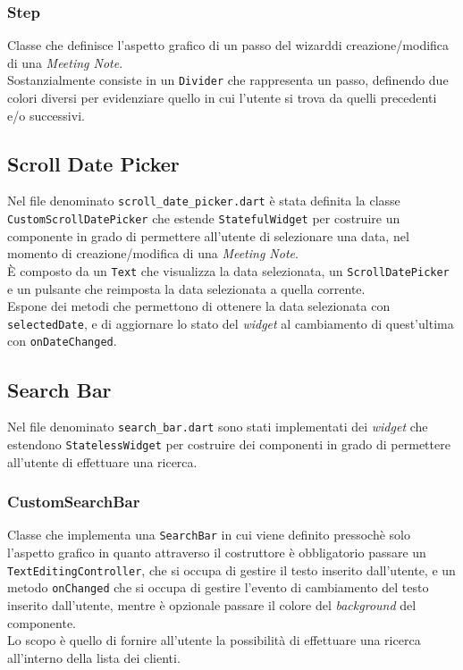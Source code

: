 \subsubsection*{Step}
\label{subsubsec:step}

Classe che definisce l'aspetto grafico di un passo del \gls{wizard}\glsoccur di creazione/modifica di una \emph{Meeting Note}.\\
Sostanzialmente consiste in un \lstinline{Divider}\cite{site:divider} che rappresenta un passo, definendo due colori diversi per evidenziare quello in cui l'utente si trova da quelli precedenti e/o successivi.

\subsection{Scroll Date Picker}
\label{subsec:scroll-date-picker}

Nel file denominato \lstinline{scroll_date_picker.dart} è stata definita la classe \lstinline{CustomScrollDatePicker} che estende \lstinline{StatefulWidget} per costruire un componente in grado di permettere all'utente di selezionare una data, nel momento di creazione/modifica di una \emph{Meeting Note}.\\
È composto da un \lstinline{Text}\cite{site:text} che visualizza la data selezionata, un \lstinline{ScrollDatePicker}\cite{site:scroll-date-picker} e un pulsante che reimposta la data selezionata a quella corrente.\\
Espone dei metodi che permettono di ottenere la data selezionata con \lstinline{selectedDate}, e di aggiornare lo stato del \emph{widget} al cambiamento di quest'ultima con \lstinline{onDateChanged}.

\subsection{Search Bar}
\label{subsec:search-bar}

Nel file denominato \lstinline{search_bar.dart} sono stati implementati dei \emph{widget} che estendono \lstinline{StatelessWidget} per costruire dei componenti in grado di permettere all'utente di effettuare una ricerca.

\subsubsection*{CustomSearchBar}
\label{subsubsec:custom-search-bar}

Classe che implementa una \lstinline{SearchBar}\cite{site:search-bar} in cui viene definito pressochè solo l'aspetto grafico in quanto attraverso il costruttore è obbligatorio passare un \lstinline{TextEditingController}\cite{site:text-editing-controller}, che si occupa di gestire il testo inserito dall'utente, e un metodo \lstinline{onChanged} che si occupa di gestire l'evento di cambiamento del testo inserito dall'utente, mentre è opzionale passare il colore del \emph{background} del componente. \\
Lo scopo è quello di fornire all'utente la possibilità di effettuare una ricerca all'interno della lista dei clienti.

